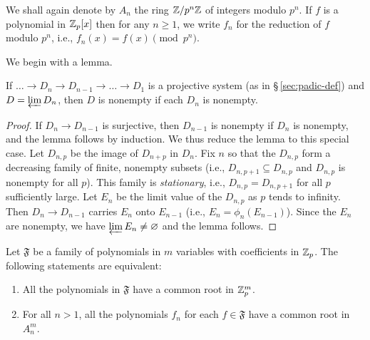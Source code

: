 We shall again denote by \(A_n\) the ring \(\Integers / p^n \Integers\) of
integers modulo \(p^n\). If \(f\) is a polynomial in \(\Integers_p[x]\) then for
any \(n \geq 1\), we write \(f_n\) for the reduction of \(f\) modulo \(p^n\),
i.e., \(f_n(x) = f(x) \pmod{p^n}\).

We begin with a lemma.

\begin{lemma}
    {\normalfont\cite[p.~13]{serre2012course}} If \(\dots \to D_n \to D_{n - 1}
    \to \dots \to D_1\) is a projective system (as in {\normalfont
    \S\,\ref{sec:padic-def}}) and \(D = \varprojlim D_n\), then \(D\) is
    nonempty if each \(D_n\) is nonempty.
\end{lemma}

\begin{proof}
    If \(D_n \to D_{n-1}\) is surjective, then \(D_{n-1}\) is nonempty if
    \(D_n\) is nonempty, and the lemma follows by induction. We thus reduce the
    lemma to this special case. Let \(D_{n, p}\) be the image of \(D_{n+p}\) in
    \(D_n\). Fix \(n\) so that the \(D_{n,p}\) form a decreasing family of
    finite, nonempty subsets (i.e., \(D_{n,p+1} \subseteq D_{n,p}\) and
    \(D_{n,p}\) is nonempty for all \(p\)). This family is \emph{stationary},
    i.e., \(D_{n,p} = D_{n,p+1}\) for all \(p\) sufficiently large. Let \(E_n\)
    be the limit value of the \(D_{n,p}\) as \(p\) tends to infinity. Then \(D_n
    \to D_{n-1}\) carries \(E_n\) onto \(E_{n-1}\) (i.e., \(E_n =
    \phi_n(E_{n-1})\)). Since the \(E_n\) are nonempty, we have \(\varprojlim
    E_n \neq \emptyset\) and the lemma follows.
\end{proof}

\begin{theoremx}\label{thm:zeros-of-polynomials-in-zp} Let \(\mathfrak{F}\) be a
    family of polynomials in \(m\) variables with coefficients in
    \(\Integers_p\). The following statements are equivalent:

    \smallskip

    \begin{enumerate}[nosep, label=(\alph*)]
        \item All the polynomials in \(\mathfrak{F}\) have a common root in
        \(\Integers_p^m\).
        \item For all \(n > 1\), all the polynomials \(f_n\) for each \(f \in
        \mathfrak{F}\) have a common root in \(A_n^m\).
    \end{enumerate}
\end{theoremx}

